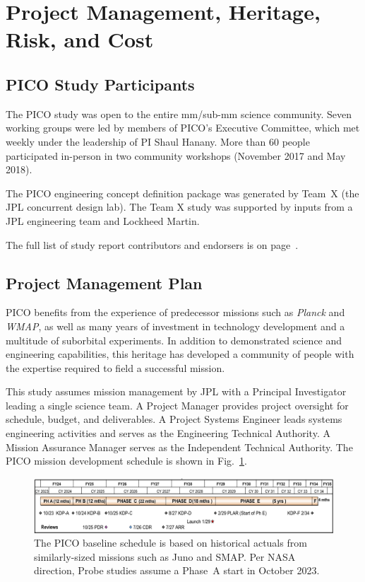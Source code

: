 \section{Project Management, Heritage, Risk, and Cost}
\label{sec:project_management} %

\subsection{PICO Study Participants}
\label{sec:study_participants} %

The PICO study was open to the entire mm/sub-mm science community.
Seven working groups were led by
members of PICO's Executive Committee, which met weekly under the
leadership of PI Shaul Hanany. More than 60 people participated
in-person in two community workshops (November 2017 and May 2018).

The PICO engineering concept definition package was generated by
Team~X (the JPL concurrent design lab). The Team X study was supported
by inputs from a JPL engineering team and Lockheed Martin.

The full list of study report contributors and endorsers is on page~\pageref{authorlist}.

\subsection{Project Management Plan}
\label{sec:management_plan} %

PICO benefits from the experience of predecessor missions such as
\textit{Planck} and \textit{WMAP}, as well as many years of investment
in technology development and a multitude of suborbital
experiments. In addition to demonstrated science and engineering
capabilities, this heritage has developed a community of people with
the expertise required to field a successful mission.

This study assumes mission management by JPL with a Principal
Investigator leading a single science team. A Project Manager provides
project oversight for schedule, budget, and deliverables. A Project
Systems Engineer leads systems engineering activities and serves as
the Engineering Technical Authority. A Mission Assurance Manager
serves as the Independent Technical Authority. The PICO mission
development schedule is shown in Fig.~\ref{fig:Schedule}.

\begin{figure}[hb]
\begin{center}
\includegraphics[width=\textwidth]{figures/Schedule.png}
\caption{\captiontext
  The PICO baseline schedule is based on historical actuals
  from similarly-sized missions such as Juno and
  SMAP. Per NASA direction, Probe studies assume a Phase~A start in October 2023.\label{fig:Schedule}}
\end{center}
\end{figure}

